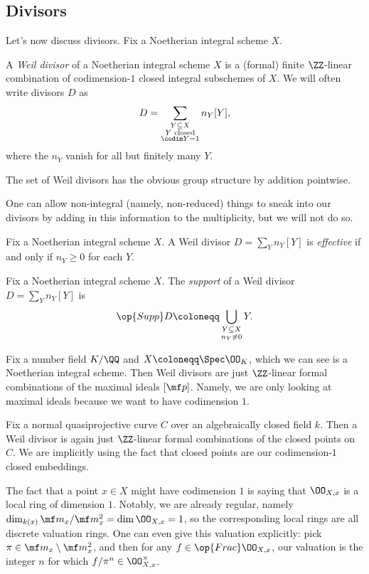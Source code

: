 \documentclass[../notes.tex]{subfiles}
\begin{document}
\subsection{Divisors}
Let's now discuss divisors. Fix a Noetherian integral scheme $X$.
\begin{definition}
	A \textit{Weil divisor} of a Noetherian integral scheme $X$ is a (formal) finite $\ZZ$-linear combination of codimension-$1$ closed integral subschemes of $X$. We will often write divisors $D$ as
	\[D=\sum_{\substack{Y\subseteq X\\Y\text{ closed}\\\codim Y=1}}n_{Y}[Y],\]
	where the $n_Y$ vanish for all but finitely many $Y$.
\end{definition}
\begin{remark}
	The set of Weil divisors has the obvious group structure by addition pointwise.
\end{remark}
One can allow non-integral (namely, non-reduced) things to sneak into our divisors by adding in this information to the multiplicity, but we will not do so.
\begin{definition}[Effective]
	Fix a Noetherian integral scheme $X$. A Weil divisor $D=\sum_Yn_Y[Y]$ is \textit{effective} if and only if $n_Y\ge0$ for each $Y$.
\end{definition}
\begin{definition}[Support]
	Fix a Noetherian integral scheme $X$. The \textit{support} of a Weil divisor $D=\sum_Yn_Y[Y]$ is
	\[\op{Supp}D\coloneqq\bigcup_{\substack{Y\subseteq X\\n_Y\ne0}}Y.\]
\end{definition}
\begin{example}
	Fix a number field $K/\QQ$ and $X\coloneqq\Spec\OO_K$, which we can see is a Noetherian integral scheme. Then Weil divisors are just $\ZZ$-linear formal combinations of the maximal ideals $[\mf p]$. Namely, we are only looking at maximal ideals because we want to have codimension $1$.
\end{example}
\begin{example}
	Fix a normal quasiprojective curve $C$ over an algebraically closed field $k$. Then a Weil divisor is again just $\ZZ$-linear formal combinations of the closed points on $C$. We are implicitly using the fact that closed points are our codimension-$1$ closed embeddings.
\end{example}
The fact that a point $x\in X$ might have codimension $1$ is saying that $\OO_{X,x}$ is a local ring of dimension $1$. Notably, we are already regular, namely $\dim_{k(x)}\mf m_x/\mf m_x^2=\dim\OO_{X,x}=1$, so the corresponding local rings are all discrete valuation rings. One can even give this valuation explicitly: pick $\pi\in\mf m_x\setminus\mf m_x^2$, and then for any $f\in\op{Frac}\OO_{X,x}$, our valuation is the integer $n$ for which $f/\pi^n\in\OO_{X,x}^\times$.
\end{document}
